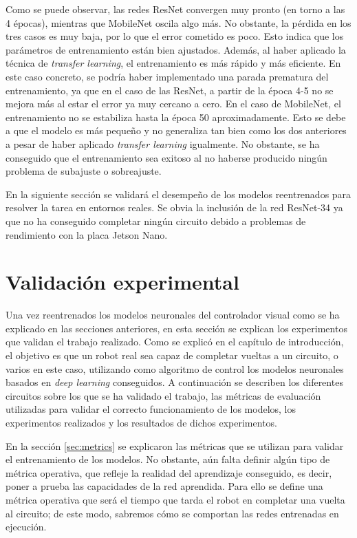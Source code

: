 Como se puede observar, las redes ResNet convergen muy pronto (en torno a las 4 épocas), mientras que MobileNet oscila algo más. No obstante, la pérdida en los tres casos es muy baja, por lo que el error cometido es poco. Esto indica que los parámetros de entrenamiento están bien ajustados. Además, al haber aplicado la técnica de \textit{transfer learning}, el entrenamiento es más rápido y más eficiente. En este caso concreto, se podría haber implementado una parada prematura del entrenamiento, ya que en el caso de las ResNet, a partir de la época 4-5 no se mejora más al estar el error ya muy cercano a cero. En el caso de MobileNet, el entrenamiento no se estabiliza hasta la época 50 aproximadamente. Esto se debe a que el modelo es más pequeño y no generaliza tan bien como los dos anteriores a pesar de haber aplicado \textit{transfer learning} igualmente. No obstante, se ha conseguido que el entrenamiento sea exitoso al no haberse producido ningún problema de subajuste o sobreajuste. 

En la siguiente sección se validará el desempeño de los modelos reentrenados para resolver la tarea en entornos reales. Se obvia la inclusión de la red ResNet-34 ya que no ha conseguido completar ningún circuito debido a problemas de rendimiento con la placa Jetson Nano.


\section{Validación experimental}

Una vez reentrenados los modelos neuronales del controlador visual como se ha explicado en las secciones anteriores, en esta sección se explican los experimentos que validan el trabajo realizado. Como se explicó en el capítulo de introducción, el objetivo es que un robot real sea capaz de completar vueltas a un circuito, o varios en este caso, utilizando como algoritmo de control los modelos neuronales basados en \textit{deep learning} conseguidos. A continuación se describen los diferentes circuitos sobre los que se ha validado el trabajo, las métricas de evaluación utilizadas para validar el correcto funcionamiento de los modelos, los experimentos realizados y los resultados de dichos experimentos.

En la sección \ref{sec:metrics} se explicaron las métricas que se utilizan para validar el entrenamiento de los modelos. No obstante, aún falta definir algún tipo de métrica operativa, que refleje la realidad del aprendizaje conseguido, es decir, poner a prueba las capacidades de la red aprendida. Para ello se define una métrica operativa que será el tiempo que tarda el robot en completar una vuelta al circuito; de este modo, sabremos cómo se comportan las redes entrenadas en ejecución.

